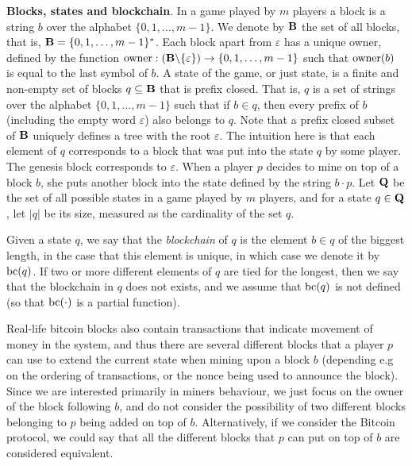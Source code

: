 \medskip
\noindent
\textbf{Blocks, states and blockchain}. In a game played by $m$ players a block is a string $b$ over the alphabet $\{0,1,\ldots, m-1\}$. We denote by $\mathbf{B}$ the set of all blocks, that is, $\mathbf{B} = \{0,1,\ldots , m-1\}^*$. Each block apart from $\varepsilon$ has a unique owner, defined by the function $\text{\rm owner}: (\mathbf{B} \backslash \{\varepsilon\}) \rightarrow \{0,1, \ldots ,m-1\}$ such that $\text{\rm owner}(b)$ is equal to the last symbol of $b$. A state of the game, or just state,  is a finite and non-empty set of blocks $q \subseteq \mathbf{B}$ that is prefix closed. That is, $q$ is a set of strings over the alphabet $\{0,1,\ldots, m-1\}$ such that if $b\in q$, then every prefix of $b$ (including the empty word $\varepsilon$) also belongs to $q$. Note that a prefix closed subset of $\mathbf{B}$ uniquely defines a tree with the root $\varepsilon$. 
%
The intuition here is that each element of $q$ corresponds to a block that was put into the state $q$ by some player. The genesis block corresponds to $\varepsilon$. When a player $p$ decides to mine on top of a block $b$, she puts another block into the state defined by the string $b\cdot p$.
%
Let $\mathbf{Q}$ be the set of all possible states in a game played by $m$ players, and for a state $q \in \mathbf{Q}$, let $|q|$ be its size, measured as the cardinality of the set $q$. 

Given a state $q$, we say that the {\em blockchain} of $q$ is the element $b\in q$ of the biggest length, in the case that this element is unique, in which case we denote it by $\text{bc}(q)$. If two or more different elements of $q$ are tied for the longest, then we say that the blockchain in $q$ does not exists, and we assume that $\text{bc}(q)$ is not defined (so that $\text{bc}(\cdot)$ is a partial function).

Real-life bitcoin blocks also contain transactions that indicate movement of money in the system, and thus there are 
several different blocks that a player $p$ can use to extend the current state when mining upon a block $b$ (depending e.g on the ordering of transactions, or the nonce being used to announce the block). Since we are interested primarily in miners behaviour, we just focus on the owner of the block following $b$, and do not consider the possibility of two different blocks belonging to $p$ being added on top of $b$. Alternatively, if we consider the Bitcoin protocol, we could say that all the different blocks that $p$ can put on top of $b$ are considered equivalent. 

